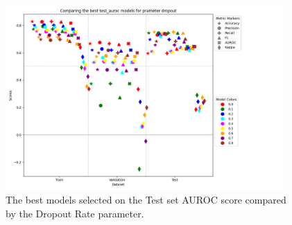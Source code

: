 \begin{figure}[H]
    \centering
    \includegraphics[width=400px]{Figures/results/dropout/dropout_test_auroc.png}
    \caption{The best models selected on the Test set AUROC score compared by the Dropout Rate parameter.}
    \label{fig: dropout_test_auroc}
\end{figure}
